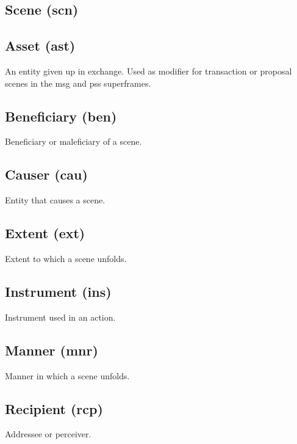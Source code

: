 \documentclass[a4paper]{article}
\begin{document}
\subsection{Scene (scn)}


\subsection{Asset (ast)}

An entity given up in exchange. Used as modifier for transaction or proposal scenes in the msg and pss superframes.

\subsection{Beneficiary (ben)}

Beneficiary or maleficiary of a scene.

\subsection{Causer (cau)}

Entity that causes a scene.

\subsection{Extent (ext)}

Extent to which a scene unfolds.

\subsection{Instrument (ins)}

Instrument used in an action.

\subsection{Manner (mnr)}

Manner in which a scene unfolds.

\subsection{Recipient (rcp)}

Addressee or perceiver.
\end{document}
